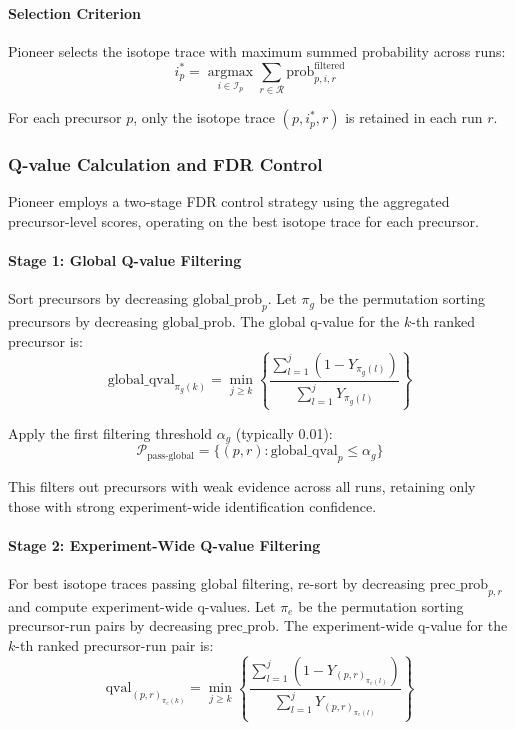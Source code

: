 \documentclass[pdflatex,sn-nature]{sn-jnl}
\begin{document}
\paragraph{Selection Criterion} Pioneer selects the isotope trace with maximum summed probability across runs:
\begin{equation}
  i^*_{p} = \underset{i \in \mathcal{I}_p}{\operatorname{argmax}} \sum_{r \in \mathcal{R}} \text{prob}_{p,i,r}^{\text{filtered}}
\end{equation}

For each precursor $p$, only the isotope trace $(p, i^*_p, r)$ is retained in each run $r$.

\subsubsection{Q-value Calculation and FDR Control}

Pioneer employs a two-stage FDR control strategy using the aggregated precursor-level scores, operating on the best isotope trace for each precursor.

\paragraph{Stage 1: Global Q-value Filtering} Sort precursors by decreasing $\text{global\_prob}_p$. Let $\pi_g$ be the permutation sorting precursors by decreasing $\text{global\_prob}$. The global q-value for the $k$-th ranked precursor is:
\begin{equation}
  \text{global\_qval}_{\pi_g(k)} = \min_{j \geq k} \left\{ \frac{\sum_{l=1}^{j} (1 - Y_{\pi_g(l)})}{\sum_{l=1}^{j} Y_{\pi_g(l)}} \right\}
\end{equation}

Apply the first filtering threshold $\alpha_g$ (typically 0.01):
\begin{equation}
  \mathcal{P}_{\text{pass-global}} = \{(p,r) : \text{global\_qval}_p \leq \alpha_g\}
\end{equation}

This filters out precursors with weak evidence across all runs, retaining only those with strong experiment-wide identification confidence.

\paragraph{Stage 2: Experiment-Wide Q-value Filtering} For best isotope traces passing global filtering, re-sort by decreasing $\text{prec\_prob}_{p,r}$ and compute experiment-wide q-values. Let $\pi_e$ be the permutation sorting precursor-run pairs by decreasing $\text{prec\_prob}$. The experiment-wide q-value for the $k$-th ranked precursor-run pair is:
\begin{equation}
  \text{qval}_{(p,r)_{\pi_e(k)}} = \min_{j \geq k} \left\{ \frac{\sum_{l=1}^{j} (1 - Y_{(p,r)_{\pi_e(l)}})}{\sum_{l=1}^{j} Y_{(p,r)_{\pi_e(l)}}} \right\}
\end{equation}
\end{document}
